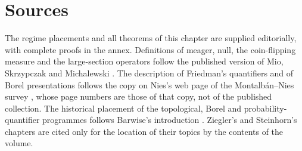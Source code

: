 \section{Sources}
\label{sec:p03-w03-p03-053-sources}

The regime placements and all theorems of this chapter are supplied
editorially, with complete proofs in the annex. Definitions of meager,
null, the coin-flipping measure and the large-section operators follow
the published version of Mio, Skrzypczak and Michalewski
\cite{MioSkrzypczakMichalewski2018}. The description of Friedman's
quantifiers and of Borel presentations follows the copy on Nies's web page of
the Montalb\'an--Nies survey \cite{MontalbanNiesBorelSurvey}, whose
page numbers are those of that copy, not of the published collection.
The historical placement of the topological, Borel and
probability-quantifier programmes follows Barwise's introduction
\cite{Barwise1985BackgroundAims}. Ziegler's and Steinhorn's chapters
are cited only for the location of their topics by the contents of the
volume.

